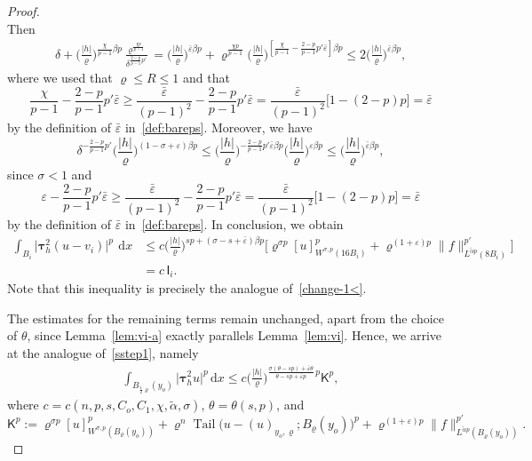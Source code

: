 \documentclass[10pt,a4paper]{amsart}
\DeclareMathOperator{\Tail}{Tail}
\renewcommand{\d}{\:\! \mathrm{d}}
\newcommand{\dx}{\mathrm{d}x}
\renewcommand{\epsilon}{\varepsilon}
\renewcommand{\rho}{\varrho}
\newcommand\sfI{{\boldsymbol{\mathsf I}}}
\newcommand\sfK{{\boldsymbol{\mathsf K}}}
\begin{document}
\begin{proof}
\[\]
Then
\begin{align*}
    \delta +
    \Big(\frac{|h|}{\rho}\Big)^{\frac{\chi}{p-1}\beta p} \frac{\rho^{\frac{\chi p}{p-1}}}{\delta^{\frac{2-p}{p-1}p'}}
    =
    \Big(\frac{|h|}{\rho}\Big)^{\bar\epsilon\beta p} +
    \rho^{\frac{\chi p}{p-1}} \Big(\frac{|h|}{\rho}\Big)^{[\frac{\chi}{p-1}-\frac{2-p}{p-1}p'\bar\epsilon]\beta p}
    \le 
    2\Big(\frac{|h|}{\rho}\Big)^{\bar\epsilon\beta p},
\end{align*}
where we used that \(\rho \le R \le 1\) and that
$$
    \frac{\chi}{p-1}-\frac{2-p}{p-1}p'\bar\epsilon
    \ge 
    \frac{\bar\epsilon}{(p-1)^2}-\frac{2-p}{p-1}p'\bar\epsilon
    =
    \frac{\bar\epsilon}{(p-1)^2} \big[1-(2-p)p\big]
    =
    \bar\epsilon
$$
by the definition of \(\bar\epsilon\) in~\eqref{def:bareps}. Moreover, we have 
$$
    \delta^{-\frac{2-p}{p-1}p'}\Big(\frac{|h|}{\rho}\Big)^{(1-\sigma+\epsilon)\beta p}
    \le  
    \Big(\frac{|h|}{\rho}\Big)^{-\frac{2-p}{p-1}p'\bar\epsilon\beta p} \Big(\frac{|h|}{\rho}\Big)^{\epsilon\beta p}
    \le 
    \Big(\frac{|h|}{\rho}\Big)^{\bar\epsilon\beta p},
$$
since \(\sigma<1\) and 
$$
    \epsilon-\frac{2-p}{p-1}p'\bar\epsilon
    \ge 
    \frac{\bar\epsilon}{(p-1)^2}-\frac{2-p}{p-1}p'\bar\epsilon
    =
    \frac{\bar\epsilon}{(p-1)^2} \big[1-(2-p)p\big]
    =
    \bar\epsilon
$$
by the definition of \(\bar\epsilon\) in~\eqref{def:bareps}.
In conclusion, we obtain
\begin{align*}
    \int_{B_i} \big|\boldsymbol\tau_h^2 (u - v_i)\big|^p \,\d x
    &\le
    c \Big(\frac{|h|}{\rho}\Big)^{sp+(\sigma-s+\bar\epsilon)\beta p} 
    \Big[ \rho^{\sigma p}[u]_{W^{\sigma,p}(16B_i)}^p +
    \rho^{(1+\epsilon)p}
    \|f\|_{L^{\tilde\alpha p}(8B_i)}^{p'} \Big] \\
    &=
    c\, \sfI_i .
\end{align*}
Note that this inequality is precisely the analogue of~\eqref{change-1<}.

The estimates for the remaining terms remain unchanged, apart from the choice of $\theta$, 
since Lemma~\ref{lem:vi-a} exactly parallels Lemma~\ref{lem:vi}. 
Hence, we arrive at the analogue of~\eqref{sstep1}, namely 
\begin{align*}
    \int_{B_{\frac12 \rho}(y_o)} \big|\boldsymbol\tau_h^2 u\big|^p \,\dx
    \le
    c \Big(\frac{|h|}{\rho}\Big)^{\frac{\sigma(\theta-sp)+\bar\epsilon\theta}{\theta-sp+\bar\epsilon p}\, p}
    \sfK^p,
\end{align*}
where $c=c(n,p,s,C_o,C_1,\chi,\tilde\alpha,\sigma)$, $\theta=\theta(s,p)$, and
\begin{equation*}
    \sfK^p
    :=
    \rho^{\sigma p}[u]_{W^{\sigma,p}(B_{\rho}(y_o))}^p + 
    \rho^{n}\Tail\big(u-(u)_{y_o,\rho};B_\rho(y_o)\big)^p + \rho^{(1+\epsilon) p}\|f\|_{L^{\tilde\alpha p}(B_\rho(y_o))}^{p'}.
\end{equation*}


\end{proof}
\end{document}
